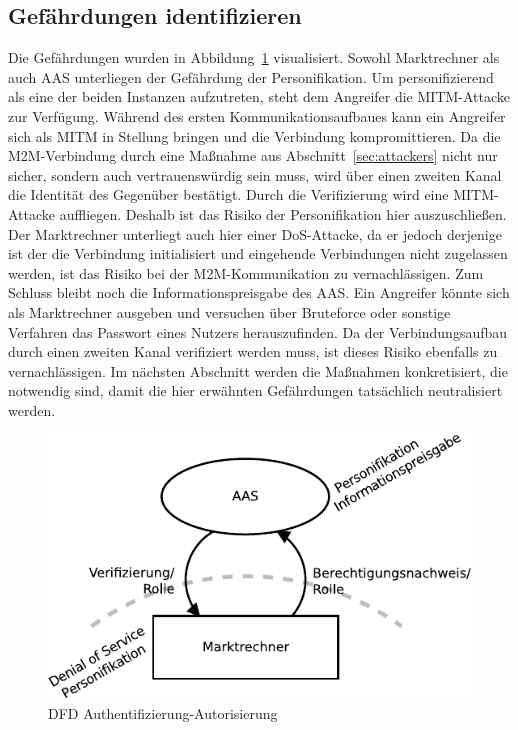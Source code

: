 \documentclass[11pt,a4paper]{report}
\begin{document}
\subsection{Gefährdungen identifizieren}

Die Gefährdungen wurden in Abbildung~\ref{fig:dfd_auth_threat} visualisiert. Sowohl Marktrechner als auch AAS unterliegen der Gefährdung der Personifikation. Um personifizierend als eine der beiden Instanzen aufzutreten, steht dem Angreifer die MITM-Attacke zur Verfügung. Während des ersten Kommunikationsaufbaues kann ein Angreifer sich als MITM in Stellung bringen und die Verbindung kompromittieren. Da die M2M-Verbindung durch eine Maßnahme aus Abschnitt~\ref{sec:attackers} nicht nur sicher, sondern auch vertrauenswürdig sein muss, wird über einen zweiten Kanal die Identität des Gegenüber bestätigt. Durch die Verifizierung wird eine MITM-Attacke auffliegen. Deshalb ist das Risiko der Personifikation hier auszuschließen. Der Marktrechner unterliegt auch hier einer DoS-Attacke, da er jedoch derjenige ist der die Verbindung initialisiert und eingehende Verbindungen nicht zugelassen werden, ist das Risiko bei der M2M-Kommunikation zu vernachlässigen. Zum Schluss bleibt noch die Informationspreisgabe des AAS. Ein Angreifer könnte sich als Marktrechner ausgeben und versuchen über Bruteforce oder sonstige Verfahren das Passwort eines Nutzers herauszufinden. Da der Verbindungsaufbau durch einen zweiten Kanal verifiziert werden muss, ist dieses Risiko ebenfalls zu vernachlässigen. Im nächsten Abschnitt werden die Maßnahmen konkretisiert, die notwendig sind, damit die hier erwähnten Gefährdungen tatsächlich neutralisiert werden.

\begin{figure}[htbp]
\centering
\includegraphics[scale=1.1]{images/dfd_auth_threat.pdf}
\caption{DFD Authentifizierung-Autorisierung}
\label{fig:dfd_auth_threat}
\end{figure}
\end{document}
